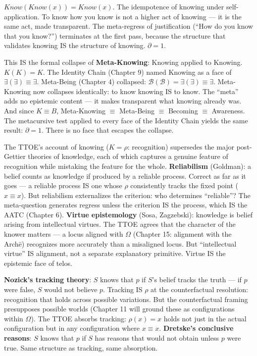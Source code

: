 \documentclass[10pt, openany, oneside]{book}
\begin{document}
$Know(Know(x)) = Know(x)$. The idempotence of knowing under self-application. To know how you know is not a higher act of knowing --- it is the same act, made transparent. The meta-regress of justification (``How do you know that you know?'') terminates at the first pass, because the structure that validates knowing IS the structure of knowing. $\partial = 1$.

This IS the formal collapse of \textbf{Meta-Knowing}: Knowing applied to Knowing. $K(K) = K$. The Identity Chain (Chapter 9) named Knowing as a face of $\exists(\exists) \equiv \exists$. Meta-Being (Chapter 4) collapsed: $\mathcal{B}(\mathcal{B}) = \exists(\exists) \equiv \exists$. Meta-Knowing now collapses identically: to know knowing IS to know. The ``meta'' adds no epistemic content --- it makes transparent what knowing already was. And since $K \equiv B$, Meta-Knowing $\equiv$ Meta-Being $\equiv$ Becoming $\equiv$ Awareness. The metacursive test applied to every face of the Identity Chain yields the same result: $\partial = 1$. There is no face that escapes the collapse.

The TTOE's account of knowing ($K = \rho$: recognition) supersedes the major post-Gettier theories of knowledge, each of which captures a genuine feature of recognition while mistaking the feature for the whole. \textbf{Reliabilism} (Goldman): a belief counts as knowledge if produced by a reliable process. Correct as far as it goes --- a reliable process IS one whose $\rho$ consistently tracks the fixed point ($x \equiv x$). But reliabilism externalizes the criterion: who determines ``reliable''? The meta-question generates regress unless the criterion IS the process, which IS the AATC (Chapter 6). \textbf{Virtue epistemology} (Sosa, Zagzebski): knowledge is belief arising from intellectual virtues. The TTOE agrees that the character of the knower matters --- a locus aligned with $\Omega$ (Chapter 15: alignment with the Arch\={e}) recognizes more accurately than a misaligned locus. But ``intellectual virtue'' IS alignment, not a separate explanatory primitive. Virtue IS the epistemic face of telos.

\textbf{Nozick's tracking theory}: $S$ knows that $p$ if $S$'s belief tracks the truth --- if $p$ were false, $S$ would not believe $p$. Tracking IS $\rho$ at the counterfactual resolution: recognition that holds across possible variations. But the counterfactual framing presupposes possible worlds (Chapter 11 will ground these as configurations within $\Omega$). The TTOE absorbs tracking: $\rho(x) = x$ holds not just in the actual configuration but in any configuration where $x \equiv x$. \textbf{Dretske's conclusive reasons}: $S$ knows that $p$ if $S$ has reasons that would not obtain unless $p$ were true. Same structure as tracking, same absorption.
\end{document}
